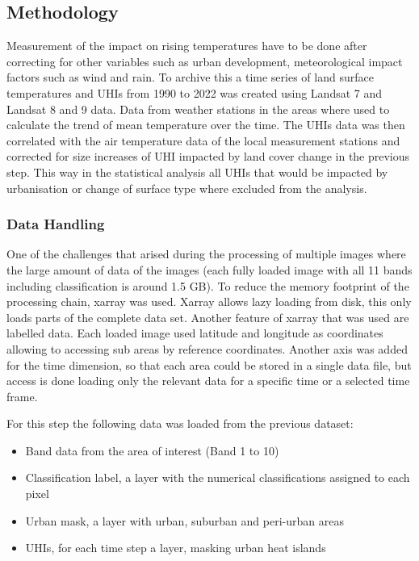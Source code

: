 \documentclass[12pt,a4paper, english,twoside]{article}
\begin{document}
    \subsection{Methodology}
      Measurement of the impact on rising temperatures have to be done after correcting for other variables such as urban development, meteorological impact factors such as wind and rain. 
      To archive this a time series of land surface temperatures and \glspl{UHI} from 1990 to 2022 was created using Landsat 7 and Landsat 8 and 9 data.
      Data from weather stations in the areas where used to calculate the trend of mean temperature over the time. 
      The \glspl{UHI} data was then correlated with the air temperature data of the local measurement stations and corrected for size increases of \gls{UHI} impacted by land cover change in the previous step. 
      This way in the statistical analysis all \glspl{UHI} that would be impacted by urbanisation or change of surface type where excluded from the analysis.
    \subsubsection{Data Handling}
      One of the challenges that arised during the processing of multiple images where the large amount of data of the images (each fully loaded image with all 11 bands including classification is around 1.5 GB).
      To reduce the memory footprint of the processing chain, xarray \autocite{hoyer2017xarray} was used. 
      Xarray allows lazy loading from disk, this only loads parts of the complete data set. 
      Another feature of xarray that was used are labelled data. Each loaded image used latitude and longitude as coordinates allowing to accessing sub areas by reference coordinates. 
      Another axis was added for the time dimension, so that each area could be stored in a single data file, but access is done loading only the relevant data for a specific time or a selected time frame.
  
      For this step the following data was loaded from the previous dataset: 
      \begin{itemize}
        \item Band data from the area of interest (Band 1 to 10)
        \item Classification label, a layer with the numerical classifications assigned to each pixel 
        \item Urban mask, a layer with urban, suburban and peri-urban areas
        \item \glspl{UHI}, for each time step a layer, masking urban heat islands
      \end{itemize}
\end{document}

